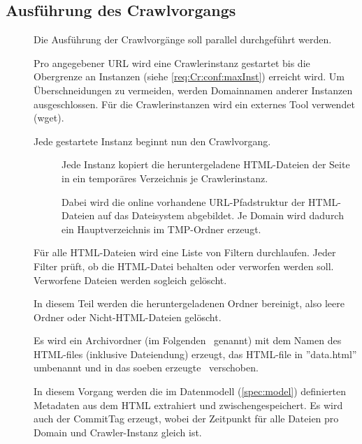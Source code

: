 \subsection{Ausführung des Crawlvorgangs}
\begin{description}
	\item []
		Die Ausführung der Crawlvorgänge soll parallel durchgeführt werden.
	\item [] 		
		Pro angegebener URL wird eine Crawlerinstanz gestartet bis die Obergrenze an Instanzen  
		(siehe \ref{req:Cr:conf:maxInst}) erreicht wird.
		Um Überschneidungen zu vermeiden, werden Domainnamen anderer Instanzen ausgeschlossen.
		Für die Crawlerinstanzen wird ein externes Tool verwendet (wget).
	\item []
		Jede gestartete Instanz beginnt nun den Crawlvorgang.
		\begin{description}
			\item []
				Jede Instanz kopiert die heruntergeladene HTML-Dateien 
				der Seite in ein temporäres Verzeichnis je Crawlerinstanz.
			\item []
				Dabei wird die online vorhandene URL-Pfadstruktur der HTML-Dateien 
				auf das Dateisystem abgebildet.
				Je Domain wird dadurch ein Hauptverzeichnis im TMP-Ordner erzeugt.
		\end{description}
	\item []
		Für alle HTML-Dateien wird eine Liste von Filtern durchlaufen.
		Jeder Filter prüft, ob die HTML-Datei behalten oder verworfen werden soll.
		Verworfene Dateien werden sogleich gelöscht.
	\item []
		In diesem Teil werden die heruntergeladenen Ordner bereinigt,
		also leere Ordner oder Nicht-HTML-Dateien gelöscht.
	\item []
		Es wird ein Archivordner (im Folgenden \htmlarc\ genannt) 
		mit dem Namen des HTML-files (inklusive Dateiendung) 
		erzeugt, das HTML-file in ''data.html'' umbenannt und 
		in das soeben erzeugte \htmlarc\ verschoben.
	\item []
		In diesem Vorgang werden die im Datenmodell (\ref{spec:model}) definierten Metadaten 
		aus dem HTML extrahiert und zwischengespeichert. Es wird auch der
		CommitTag erzeugt, wobei der Zeitpunkt für alle Dateien pro Domain und Crawler-Instanz gleich ist.

\end{description}
